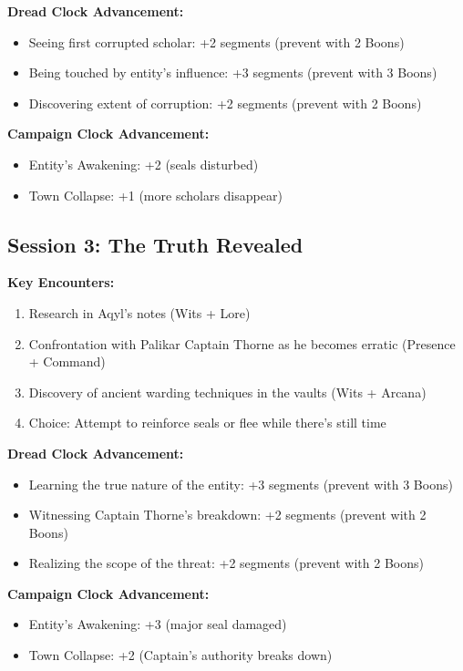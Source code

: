 \documentclass[11pt]{article}
\begin{document}
\textbf{Dread Clock Advancement:}
\begin{itemize}
\item Seeing first corrupted scholar: +2 segments (prevent with 2 Boons)
\item Being touched by entity's influence: +3 segments (prevent with 3 Boons)
\item Discovering extent of corruption: +2 segments (prevent with 2 Boons)
\end{itemize}

\textbf{Campaign Clock Advancement:}
\begin{itemize}
\item Entity's Awakening: +2 (seals disturbed)
\item Town Collapse: +1 (more scholars disappear)
\end{itemize}

\subsection{Session 3: The Truth Revealed}

\textbf{Key Encounters:}
\begin{enumerate}
\item Research in Aqyl's notes (Wits + Lore)
\item Confrontation with Palikar Captain Thorne as he becomes erratic (Presence + Command)
\item Discovery of ancient warding techniques in the vaults (Wits + Arcana)
\item Choice: Attempt to reinforce seals or flee while there's still time
\end{enumerate}

\textbf{Dread Clock Advancement:}
\begin{itemize}
\item Learning the true nature of the entity: +3 segments (prevent with 3 Boons)
\item Witnessing Captain Thorne's breakdown: +2 segments (prevent with 2 Boons)
\item Realizing the scope of the threat: +2 segments (prevent with 2 Boons)
\end{itemize}

\textbf{Campaign Clock Advancement:}
\begin{itemize}
\item Entity's Awakening: +3 (major seal damaged)
\item Town Collapse: +2 (Captain's authority breaks down)
\end{itemize}
\end{document}

